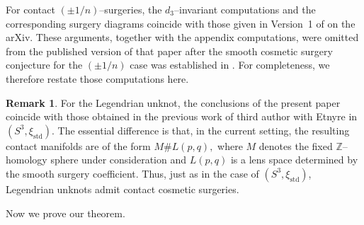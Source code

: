 \documentclass[12pt]{amsart}
\theoremstyle{definition}
\newtheorem{remark} [theorem] {Remark}
\theoremstyle{definition}
\begin{document}
For contact $(\pm 1/n)$–surgeries, the $d_3$–invariant computations
and the corresponding surgery diagrams coincide with those given
in Version~1 of \cite{ES} on the arXiv. These arguments, together
with the appendix computations, were omitted from the published
version of that paper after the smooth cosmetic surgery conjecture
for the $(\pm 1/n)$ case was established in
\cite{DEL}. For completeness, we therefore restate
those computations here.


\begin{remark}
For the Legendrian unknot, the conclusions of the present paper
coincide with those obtained in the previous work of third author with Etnyre \cite{ES} in
$(S^3,\xi_{\mathrm{std}})$.
The essential difference is that, in the current setting,
the resulting contact manifolds are of the form
$M \# L(p,q),$
where $M$ denotes the fixed $\mathbb{Z}$–homology sphere under
consideration and $L(p,q)$ is a lens space determined by the
smooth surgery coefficient. Thus, just as in the case of $(S^3,\xi_{\mathrm{std}})$,
Legendrian unknots admit contact cosmetic surgeries.
\end{remark}

	
 Now we prove our theorem.
	
\end{document}
